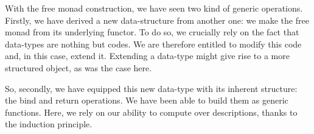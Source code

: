 With the free monad construction, we have seen two kind of generic
operations. Firstly, we have derived a new data-structure from another
one: we make the free monad from its underlying functor. To do so, we
crucially rely on the fact that data-types are nothing but codes. We
are therefore entitled to modify this code and, in this case, extend
it. Extending a data-type might give rise to a more structured
object, as was the case here.

So, secondly, we have equipped this new data-type with its inherent
structure: the bind and return operations. We have been able to build
them as generic functions. Here, we rely on our ability to compute
over descriptions, thanks to the induction principle.
